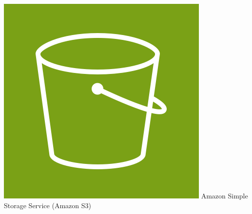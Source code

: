 \begin{frame}[t]{\ftitle}
\begin{minipage}{.33\textwidth}
        \includegraphics[keepaspectratio,width=\textwidth]{Arch_Amazon-Simple-Storage-Service_64@5x.png}
        {\scriptsize Amazon Simple Storage Service (Amazon S3)}
    \end{minipage}
\end{frame}